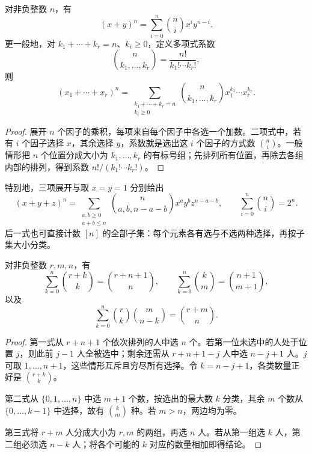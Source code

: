 \documentclass[lang=cn,a4paper,fontset=none,zihao=false,10pt,openany,twoside]{beautybook}
\numberwithin{algorithm}{chapter}
\begin{document}
\begin{proposition}[二项式与多项式展开]\label{prop:binomial-multinomial}
对非负整数 $n$，有
\[
 (x+y)^n=\sum_{i=0}^n\binom ni x^iy^{n-i}.
\]
更一般地，对 $k_1+\cdots+k_r=n$、$k_i\ge0$，定义多项式系数
\[
 \binom n{k_1,\ldots,k_r}=\frac{n!}{k_1!\cdots k_r!},
\]
则
\[
 (x_1+\cdots+x_r)^n
 =\sum_{\substack{k_1+\cdots+k_r=n\\k_i\ge0}}
 \binom n{k_1,\ldots,k_r}x_1^{k_1}\cdots x_r^{k_r}.
\]
\end{proposition}
\begin{proof}
展开 $n$ 个因子的乘积，每项来自每个因子中各选一个加数。二项式中，若有 $i$ 个因子选择 $x$，其余选择 $y$，系数就是选出这 $i$ 个因子的方式数 $\binom ni$。一般情形把 $n$ 个位置分成大小为 $k_1,\ldots,k_r$ 的有标号组；先排列所有位置，再除去各组内部的排列，得到系数 $n!/(k_1!\cdots k_r!)$。
\end{proof}
特别地，三项展开与取 $x=y=1$ 分别给出
\[
 (x+y+z)^n=\sum_{\substack{a,b\ge0\\a+b\le n}}
 \binom n{a,b,n-a-b}x^ay^bz^{n-a-b},
 \qquad \sum_{i=0}^n\binom ni=2^n.
\]
后一式也可直接计数 $[n]$ 的全部子集：每个元素各有选与不选两种选择，再按子集大小分类。

\begin{proposition}\label{prop:binomial-sums}
对非负整数 $r,m,n$，有
\[
 \sum_{k=0}^n\binom{r+k}k=\binom{r+n+1}n,
 \qquad
 \sum_{k=0}^n\binom km=\binom{n+1}{m+1},
\]
以及
\[
 \sum_{k=0}^n\binom rk\binom m{n-k}=\binom{r+m}n.
\]
\end{proposition}
\begin{proof}
第一式从 $r+n+1$ 个依次排列的人中选 $n$ 个。若第一位未选中的人处于位置 $j$，则此前 $j-1$ 人全被选中；剩余还需从 $r+n+1-j$ 人中选 $n-j+1$ 人。$j$ 可取 $1,\ldots,n+1$，这些情形互斥且穷尽所有选择。令 $k=n-j+1$，各类数量正好是 $\binom{r+k}k$。

第二式从 $\{0,1,\ldots,n\}$ 中选 $m+1$ 个数，按选出的最大数 $k$ 分类，其余 $m$ 个数从 $\{0,\ldots,k-1\}$ 中选择，故有 $\binom km$ 种。若 $m>n$，两边均为零。

第三式将 $r+m$ 人分成大小为 $r,m$ 的两组，再选 $n$ 人。若从第一组选 $k$ 人，第二组必须选 $n-k$ 人；将各个可能的 $k$ 对应的数量相加即得结论。
\end{proof}
\end{document}
